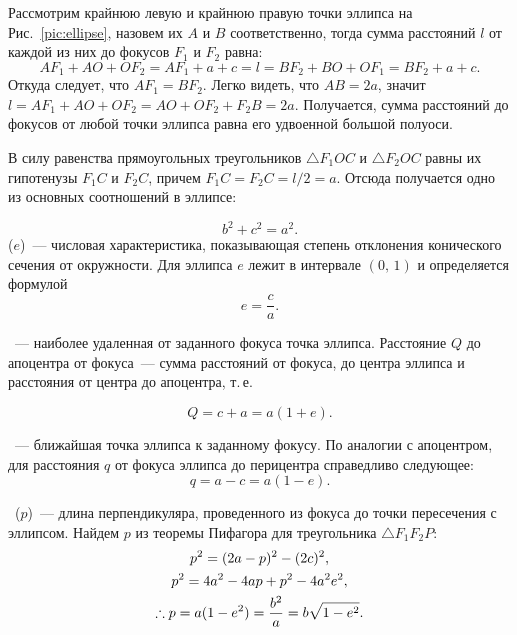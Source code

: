 Рассмотрим крайнюю левую и крайнюю правую точки эллипса на Рис.~\ref{pic:ellipse}, назовем их $A$ и $B$ соответственно, тогда сумма расстояний $l$ от каждой из них до фокусов $F_1$ и $F_2$ равна:
\begin{equation*}
	AF_1 + AO + OF_2 = AF_1 + a + c = l = BF_2 + BO + OF_1 = BF_2 + a + c.
\end{equation*}
Откуда следует, что $A F_1 = B F_2$. Легко видеть, что $AB = 2a$, значит $l = AF_1 + AO + OF_2 = AO + OF_2 + F_2B = 2a$. Получается, сумма расстояний до фокусов от любой точки эллипса равна его удвоенной большой полуоси.

В силу равенства прямоугольных треугольников $\triangle F_1 O C$ и $\triangle F_2 O C$ равны их гипотенузы $F_1C$ и $F_2C$, причем $F_1C= F_2C = l/2 = a$. Отсюда получается одно из основных соотношений в эллипсе:

\begin{equation}
	b^2 + c^2 = a^2.
\end{equation}
 ($e$)~--- числовая
характеристика, показывающая степень отклонения конического сечения от окружности. Для эллипса $e$ лежит в интервале $(0, \, 1)$ и
определяется формулой
\begin{equation}
	e = \frac{c}{a}.
\end{equation}

~--- наиболее удаленная от заданного фокуса точка эллипса. Расстояние $Q$ до апоцентра от фокуса~--- сумма расстояний от фокуса, до центра эллипса и расстояния от центра до апоцентра, т.\,е.

\begin{equation}
	Q = c + a = a (1 + e).
\end{equation}

~--- ближайшая точка эллипса к заданному фокусу. По аналогии с апоцентром, для расстояния $q$ от фокуса эллипса до перицентра справедливо следующее:
\begin{equation}
	q = a - c = a (1 - e).
\end{equation}

~($p$)~--- длина перпендикуляра, проведенного из фокуса до точки пересечения с эллипсом. Найдем $p$ из теоремы Пифагора для треугольника $\triangle F_1 F_2 P$:
\begin{gather}
	p^2 = (2a - p)^2 - (2c)^2, \notag\\
	p^2 =  4a^2 - 4ap + p^2 - 4a^2e^2,\notag\\
	\therefore p = a (1 - e^2) = \frac{b^2}{a} = b \sqrt{1 - e^2}.
\end{gather}


